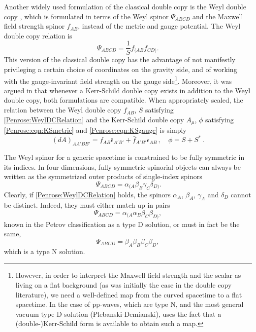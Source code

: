 Another widely used formulation of the classical double copy is the Weyl double copy
\cite{Luna:2018dpt,Godazgar:2020zbv}, which is formulated in terms of the Weyl spinor $\Psi_{ABCD}$ and the Maxwell
field strength spinor $f_{AB}$, instead of the metric and gauge potential. The Weyl double copy relation is
\begin{equation} \label{Penrose:WeylDCRelation} 
    \Psi_{ABCD} = \frac{1}{S} f_{(AB} f_{CD)}.
\end{equation}
This version of the classical double copy has the advantage of not manifestly privileging a certain choice of coordinates on the
gravity side, and of working with the gauge-invariant field strength on the gauge side\footnote{However,
    in order to interpret the Maxwell field strength and the scalar as living on a flat background
    (as was initially the case in the double copy literature), we need a well-defined map from the curved
    spacetime to a flat spacetime. In the case of pp-waves, which are type N, and the most general vacuum type D
solution (Plebanski-Demianski), \cite{Luna:2018dpt} uses the fact that a (double-)Kerr-Schild form is available to
obtain such a map.}. Moreover, it was argued in \cite{Luna:2018dpt} that whenever a Kerr-Schild double copy exists in addition to the Weyl double copy, both formulations are compatible. When appropriately scaled, the relation between the Weyl double copy $f_{AB}$, $S$ satisfying \eqref{Penrose:WeylDCRelation} and the Kerr-Schild double copy $A_{\mu}$, $\phi$ satisfying \eqref{Penrose:eqn:KSmetric} and \eqref{Penrose:eqn:KSgauge} is simply
\begin{equation}\label{Penrose:eqn:WeyltoKSrelation}
	(dA)_{AA' BB'} = f_{AB} \bar{\epsilon}_{A'B'} + \bar{f}_{A'B'} \epsilon_{AB} \, , \quad \phi = S + S^* \, .
\end{equation}

The Weyl spinor for a generic spacetime is constrained to be fully symmetric in its indices. In four dimensions,
fully symmetric spinorial objects can always be written as the symmetrized outer products of single-index spinors
\begin{equation} \ 
    \Psi_{ABCD} = \alpha_{(A} \beta_{B} \gamma_{C} \delta_{D)}.
\end{equation}
Clearly, if \eqref{Penrose:WeylDCRelation} holds, the spinors $\alpha_{A}$, $\beta_{A}$, $\gamma_{A}$ and $\delta_{D}$
cannot be distinct. Indeed, they must either match up in pairs
\begin{equation} \label{Penrose:eqn:spinortypeD} 
    \Psi_{ABCD} = \alpha_{(A} \alpha_{B} \beta_{C} \beta_{D)},
\end{equation}
known in the Petrov classification as a type D solution, or must in fact be the same,
\begin{equation} \label{Penrose:eqn:spinortypeN} 
    \Psi_{ABCD} = \beta_{A} \beta_{B} \beta_{C} \beta_{D},
\end{equation}
which is a type N solution.

